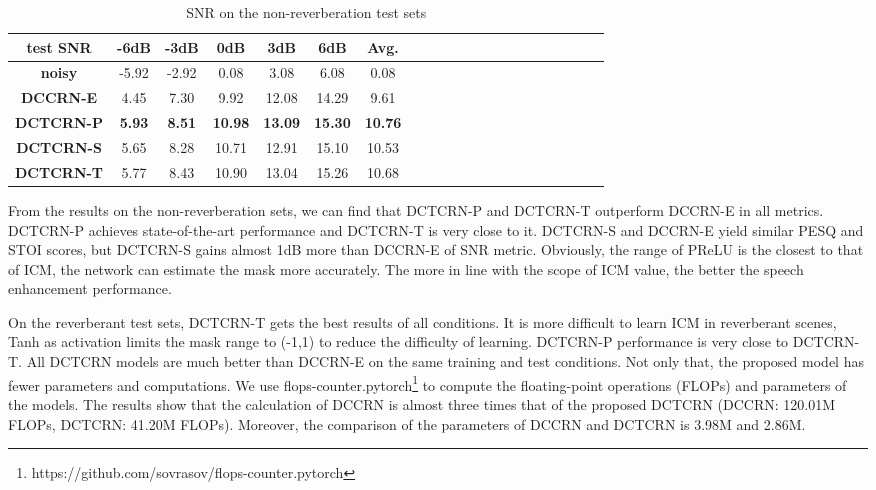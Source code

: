 \documentclass[journal,10pt]{IEEEtran}
\begin{document}
\begin{table}[!t]  \centering
\small
\caption{SNR on the non-reverberation test sets}
\label{tab:snr}
\setlength{\tabcolsep}{1.7mm}
\begin{tabular}{c<{\centering}|c<{\centering}c<{\centering}c<{\centering}c<{\centering}c<{\centering}c<{\centering}c<{\centering}c<{\centering}c<{\centering}c<{\centering}|c<{\centering}c<{\centering}c<{\centering}c<{\centering}c<{\centering}c<{\centering}c<{\centering}c<{\centering}c<{\centering}c<{\centering}}
\hline
\hline
\textbf{test SNR} & \textbf{-6dB} & \textbf{-3dB} & \textbf{0dB} & \textbf{3dB} & \textbf{6dB} & \textbf{Avg.} \\
\hline
\hline
\textbf{noisy}    & -5.92 & -2.92 & 0.08 & 3.08 & 6.08 & 0.08 \\
\textbf{DCCRN-E}  & 4.45 & 7.30 & 9.92 & 12.08 & 14.29 & 9.61 \\
\textbf{DCTCRN-P} & \textbf{5.93} & \textbf{8.51} & \textbf{10.98} & \textbf{13.09} & \textbf{15.30} & \textbf{10.76} \\
\textbf{DCTCRN-S} & 5.65 & 8.28 & 10.71 & 12.91 & 15.10 & 10.53 \\
\textbf{DCTCRN-T} & 5.77 & 8.43 & 10.90 & 13.04 & 15.26 & 10.68 \\
\hline
\hline
\end{tabular}
\end{table}

From the results on the non-reverberation sets, we can find that DCTCRN-P and DCTCRN-T outperform DCCRN-E in all metrics. DCTCRN-P achieves state-of-the-art performance and DCTCRN-T is very close to it. DCTCRN-S and DCCRN-E yield similar PESQ and STOI scores, but DCTCRN-S gains almost 1dB more than DCCRN-E of SNR metric.  Obviously, the range of PReLU is the closest to that of ICM, the network can estimate the mask more accurately. The more in line with the scope of ICM value, the better the speech enhancement performance.

On the reverberant test sets, DCTCRN-T gets the best results of all conditions. It is more difficult to learn ICM in reverberant scenes, Tanh as activation limits the mask range to (-1,1) to reduce the difficulty of learning. DCTCRN-P performance is very close to DCTCRN-T. All DCTCRN models are much better than DCCRN-E on the same training and test conditions. Not only that, the proposed model has fewer parameters and computations. We use flops-counter.pytorch\footnote{https://github.com/sovrasov/flops-counter.pytorch} to compute the floating-point operations (FLOPs) and parameters of the models. The results show that the calculation of DCCRN is almost three times that of the proposed DCTCRN (DCCRN: 120.01M FLOPs, DCTCRN: 41.20M FLOPs). Moreover, the comparison of the parameters of DCCRN and DCTCRN is 3.98M and 2.86M.
\end{document}
